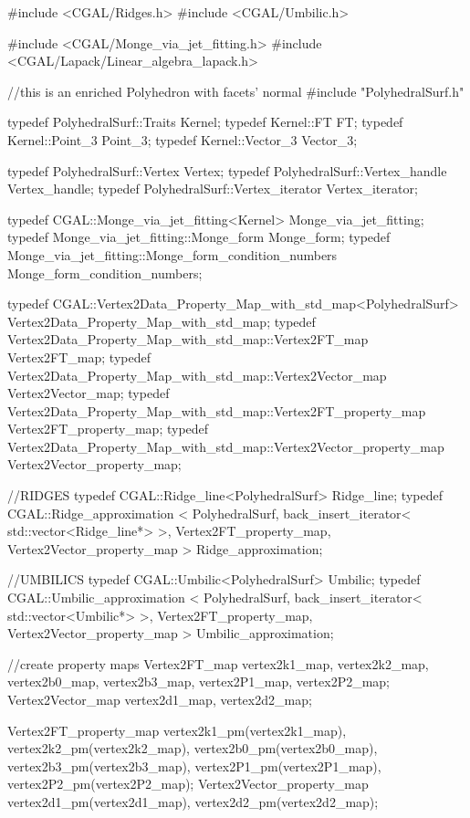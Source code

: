 \begin{ccExampleCode} 
#include <CGAL/Ridges.h> 
#include <CGAL/Umbilic.h>

#include <CGAL/Monge_via_jet_fitting.h> 
#include <CGAL/Lapack/Linear_algebra_lapack.h>
 
//this is an enriched Polyhedron with facets' normal
#include "PolyhedralSurf.h"

typedef PolyhedralSurf::Traits          Kernel;
typedef Kernel::FT                      FT;
typedef Kernel::Point_3                 Point_3;
typedef Kernel::Vector_3                Vector_3;

typedef PolyhedralSurf::Vertex          Vertex;
typedef PolyhedralSurf::Vertex_handle   Vertex_handle;
typedef PolyhedralSurf::Vertex_iterator Vertex_iterator;

typedef CGAL::Monge_via_jet_fitting<Kernel>    Monge_via_jet_fitting;
typedef Monge_via_jet_fitting::Monge_form      Monge_form;
typedef Monge_via_jet_fitting::Monge_form_condition_numbers Monge_form_condition_numbers;
      
typedef CGAL::Vertex2Data_Property_Map_with_std_map<PolyhedralSurf> Vertex2Data_Property_Map_with_std_map;
typedef Vertex2Data_Property_Map_with_std_map::Vertex2FT_map Vertex2FT_map;
typedef Vertex2Data_Property_Map_with_std_map::Vertex2Vector_map Vertex2Vector_map;
typedef Vertex2Data_Property_Map_with_std_map::Vertex2FT_property_map Vertex2FT_property_map;
typedef Vertex2Data_Property_Map_with_std_map::Vertex2Vector_property_map Vertex2Vector_property_map;

//RIDGES
typedef CGAL::Ridge_line<PolyhedralSurf> Ridge_line;
typedef CGAL::Ridge_approximation < PolyhedralSurf,
				    back_insert_iterator< std::vector<Ridge_line*> >,
				    Vertex2FT_property_map,
				    Vertex2Vector_property_map > Ridge_approximation;
  

//UMBILICS
typedef CGAL::Umbilic<PolyhedralSurf> Umbilic;
typedef CGAL::Umbilic_approximation < PolyhedralSurf,
				      back_insert_iterator< std::vector<Umbilic*> >, 
				      Vertex2FT_property_map, 
				      Vertex2Vector_property_map > Umbilic_approximation;

//create property maps
Vertex2FT_map vertex2k1_map, vertex2k2_map, 
  vertex2b0_map, vertex2b3_map, 
  vertex2P1_map, vertex2P2_map;
Vertex2Vector_map vertex2d1_map, vertex2d2_map;

Vertex2FT_property_map vertex2k1_pm(vertex2k1_map), vertex2k2_pm(vertex2k2_map), 
  vertex2b0_pm(vertex2b0_map), vertex2b3_pm(vertex2b3_map), 
  vertex2P1_pm(vertex2P1_map), vertex2P2_pm(vertex2P2_map);
Vertex2Vector_property_map vertex2d1_pm(vertex2d1_map), vertex2d2_pm(vertex2d2_map);


\end{ccExampleCode}

